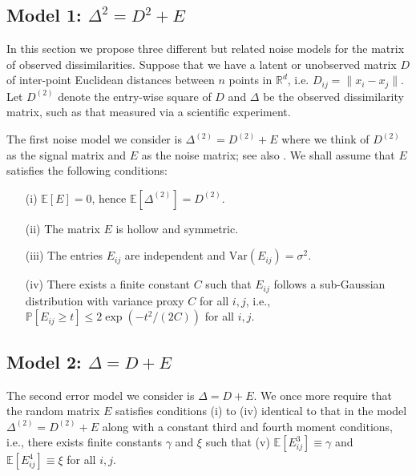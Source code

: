 \subsection{Model 1: $\Delta^2 = D^2 + E$}
\label{sec:M&E} In this section we propose three different but
related noise models for the matrix of observed dissimilarities.
Suppose that we have a latent or unobserved matrix $D$ of inter-point Euclidean distances between $n$ points in $\mathbb{R}^d$,
i.e. $D_{ij} = \|x_i - x_j\|$. Let $D^{(2)}$ denote the entry-wise
square of $D$ and $\Delta$ be the observed dissimilarity matrix, such
as that measured via a scientific experiment.

The first noise model we consider is $\Delta^{(2)} = D^{(2)} + E$ 
where we think of $D^{(2)}$ as the signal matrix and $E$ as the noise
matrix; see also \citet{DsquaredplusE}. We shall assume that $E$
satisfies the following conditions:
\begin{enumerate}[]
  \item[(i)] $\mathbb{E}[E] = 0$, hence $\mathbb{E}[\Delta^{(2)}] = D^{(2)}$.
  \item[(ii)] The matrix $E$ is hollow and symmetric.
  \item[(iii)] The entries $E_{ij}$ are independent and $\mathrm{Var}(E_{ij}) = \sigma^2$.
  \item[(iv)] There exists a finite constant $C$ such that $E_{ij}$
    follows a sub-Gaussian distribution with variance proxy $C$ 
    for all $i,j$, i.e., $\mathbb{P}[E_{ij} \geq t] \leq
    2\exp(-t^2/(2C))$ for all $i,j$. 
\end{enumerate}

\subsection{Model 2: $\Delta = D + E$}
\label{D+E} 
The second error model we consider is $\Delta = D + E$. We once more require that the random matrix $E$ satisfies conditions (i) to
(iv) identical to that in the model $\Delta^{(2)} = D^{(2)} + E$ along
with a constant third and fourth
moment conditions, i.e., there exists finite constants $\gamma$
and $\xi$ such that (v) $\mathbb{E} [E_{ij}^3] \equiv \gamma$ and $\mathbb{E}
[E_{ij} ^ 4] \equiv \xi$ for all $i,j$.

